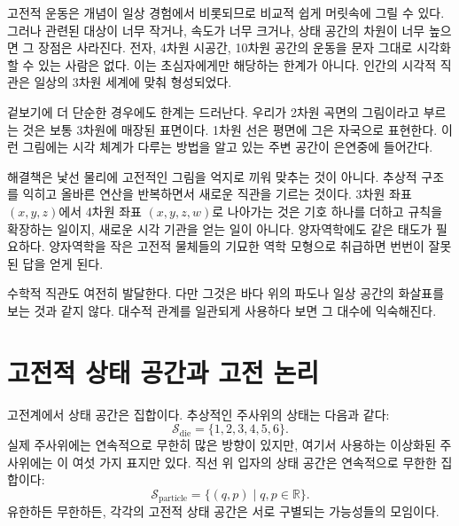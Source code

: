 고전적 운동은 개념이 일상 경험에서 비롯되므로 비교적 쉽게 머릿속에 그릴 수 있다. 그러나 관련된 대상이 너무 작거나, 속도가 너무 크거나, 상태 공간의 차원이 너무 높으면 그 장점은 사라진다. 전자, 4차원 시공간, 10차원 공간의 운동을 문자 그대로 시각화할 수 있는 사람은 없다. 이는 초심자에게만 해당하는 한계가 아니다. 인간의 시각적 직관은 일상의 3차원 세계에 맞춰 형성되었다.

겉보기에 더 단순한 경우에도 한계는 드러난다. 우리가 2차원 곡면의 그림이라고 부르는 것은 보통 3차원에 매장된 표면이다. 1차원 선은 평면에 그은 자국으로 표현한다. 이런 그림에는 시각 체계가 다루는 방법을 알고 있는 주변 공간이 은연중에 들어간다.

해결책은 낯선 물리에 고전적인 그림을 억지로 끼워 맞추는 것이 아니다. 추상적 구조를 익히고 올바른 연산을 반복하면서 새로운 직관을 기르는 것이다. 3차원 좌표 \((x,y,z)\)에서 4차원 좌표 \((x,y,z,w)\)로 나아가는 것은 기호 하나를 더하고 규칙을 확장하는 일이지, 새로운 시각 기관을 얻는 일이 아니다. 양자역학에도 같은 태도가 필요하다. 양자역학을 작은 고전적 물체들의 기묘한 역학 모형으로 취급하면 번번이 잘못된 답을 얻게 된다.

\begin{remark}
수학적 직관도 여전히 발달한다. 다만 그것은 바다 위의 파도나 일상 공간의 화살표를 보는 것과 같지 않다. 대수적 관계를 일관되게 사용하다 보면 그 대수에 익숙해진다.
\end{remark}

\section{고전적 상태 공간과 고전 논리}

고전계에서 상태 공간은 집합이다. 추상적인 주사위의 상태는 다음과 같다:
\begin{equation}
  \mathcal S_{\mathrm{die}}=\{1,2,3,4,5,6\}.
\end{equation}
실제 주사위에는 연속적으로 무한히 많은 방향이 있지만, 여기서 사용하는 이상화된 주사위에는 이 여섯 가지 표지만 있다. 직선 위 입자의 상태 공간은 연속적으로 무한한 집합이다:
\begin{equation}
  \mathcal S_{\mathrm{particle}}
  =
  \{(q,p)\mid q,p\in\mathbb R\}.
\end{equation}
유한하든 무한하든, 각각의 고전적 상태 공간은 서로 구별되는 가능성들의 모임이다.

